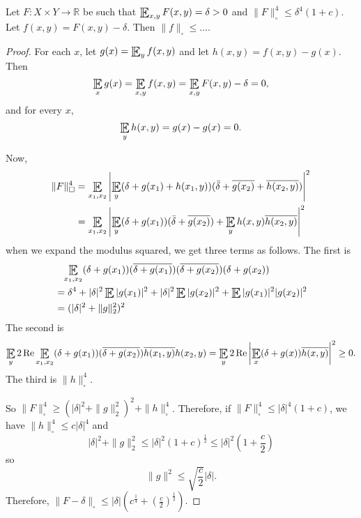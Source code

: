 \documentclass{article}
\DeclareMathOperator*{\E}{\scalerel*{\mathbb{E}}{\textstyle\sum}}
\newcommand{\1}[1]{\mathbbm{1}_{#1}}
\begin{document}
\begin{nlemma}\label{lem:3.5}
  Let $F: X \times Y \to \mathbb{R}$ be such that $\E_{x,y} F(x,y) = \delta >0$ and $\|F\|_\square^4 \leq \delta^4 (1+c)$.
  Let $f(x,y) = F(x,y) - \delta$.
  Then $\|f\|_\square \leq \dots$.
\end{nlemma}
\begin{proof}
  For each $x$, let $g(x)= \E_y f(x,y)$ and let $h(x,y) = f(x,y) - g(x)$.
  Then
  \begin{equation*}\E_x g(x) = \E_{x,y} f(x,y) = \E_{x,y} F(x,y) - \delta = 0,\end{equation*}
  and for every $x$,
  \begin{equation*}\E_y h(x,y) = g(x) - g(x) = 0.\end{equation*}

  Now,
  \begin{align*}
    \|F\|_\square^4 &= \E_{x_1, x_2} \left|\E_y (\delta + g(x_1) + h(x_1, y)) (\bar{\delta} + \overline{g(x_2)} + \overline{h(x_2, y)})\right|^2 \\
                    &= \E_{x_1,x_2} \left|\E_y (\delta + g(x_1)) (\bar{\delta} + \overline{g(x_2)}) + \E_y h(x,y) \overline{h(x_2, y)}\right|^2
  \end{align*}
  when we expand the modulus squared, we get three terms as follows. The first is
  \begin{align*}
    &\phantom{=}\E_{x_1,x_2} (\delta + g(x_1))(\overline{\delta + g(x_1)})(\overline{\delta + g(x_2)})(\delta + g(x_2)) \\
    &= \delta^4 + |\delta|^2 \E |g(x_1)|^2 + |\delta|^2 \E |g(x_2)|^2 + \E |g(x_1)|^2 |g(x_2)|^2 \\
    &= (|\delta|^2 + \|g\|_2^2)^2
  \end{align*}
  The second is
  \begin{equation*}
    \E_y 2 \operatorname{Re} \E_{x_1,x_2} (\delta + g(x_1)) (\overline{\delta + g(x_2)}) \overline{h(x_1,y)} h(x_2,y) = \E_y 2 \operatorname{Re} \left|\E_x (\delta+g(x)) \overline{h(x,y)}\right|^2 \geq 0.
  \end{equation*}
  The third is $\|h\|_\square^4$.

  So $\|F\|_\square^4 \geq (|\delta|^2 + \|g\|^2_2)^2 + \|h\|_\square^4$.
  Therefore, if $\|F\|_\square^4 \leq |\delta|^4 (1+c)$, we have $\|h\|_\square^4 \leq c |\delta|^4$ and
  \begin{equation*}
    |\delta|^2 + \|g\|_2^2 \leq |\delta|^2 (1+c)^\frac{1}{2} \leq |\delta|^2 (1 + \frac{c}{2})
  \end{equation*}
  so
  \begin{equation*}
    \|g\|^2 \leq \sqrt{\frac{c}{2}} |\delta|.
  \end{equation*}
  Therefore, $\|F-\delta\|_\square \leq |\delta| (c^{\frac{1}{4}} + (\frac{c}{2})^\frac{1}{2}).$
\end{proof}
\end{document}
